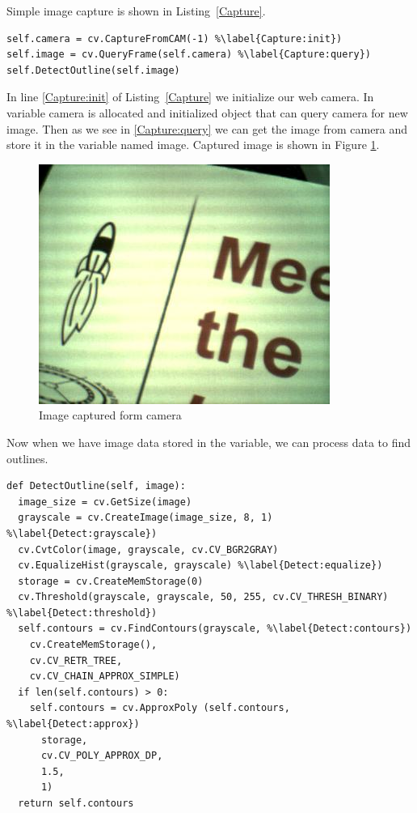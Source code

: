 \documentclass{ifacconf}
\begin{document}
Simple image capture is shown in Listing~\ref{Capture}.
\begin{lstlisting}[caption=Query image frame from web camera, label=Capture]
self.camera = cv.CaptureFromCAM(-1) %\label{Capture:init})
self.image = cv.QueryFrame(self.camera) %\label{Capture:query})
self.DetectOutline(self.image)
\end{lstlisting}
In line \ref{Capture:init} of Listing~\ref{Capture} we initialize our web
camera. In variable camera is allocated and initialized object that can query
camera for new image. Then as we see in \ref{Capture:query} we can get the
image from camera and store it in the variable named image. Captured image
is shown in Figure \ref{fig:captured}.
\begin{figure}[h]
\center
\includegraphics[width=0.8\columnwidth]{images/1test.png}
\caption{Image captured form camera}
\label{fig:captured}
\end{figure}

Now when we have image data stored in the variable, we can process data to find
outlines.

\begin{lstlisting}[caption=Outline detection, label=Detect]
def DetectOutline(self, image):
  image_size = cv.GetSize(image)
  grayscale = cv.CreateImage(image_size, 8, 1)	%\label{Detect:grayscale})
  cv.CvtColor(image, grayscale, cv.CV_BGR2GRAY)
  cv.EqualizeHist(grayscale, grayscale)	%\label{Detect:equalize})
  storage = cv.CreateMemStorage(0)
  cv.Threshold(grayscale, grayscale, 50, 255, cv.CV_THRESH_BINARY) %\label{Detect:threshold})
  self.contours = cv.FindContours(grayscale, %\label{Detect:contours})
    cv.CreateMemStorage(),
    cv.CV_RETR_TREE,
    cv.CV_CHAIN_APPROX_SIMPLE)
  if len(self.contours) > 0:
    self.contours = cv.ApproxPoly (self.contours, %\label{Detect:approx})
      storage,
      cv.CV_POLY_APPROX_DP,
      1.5,
      1)
  return self.contours
\end{lstlisting}
\end{document}
